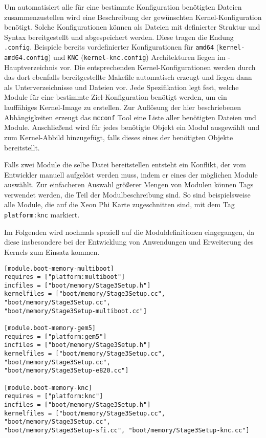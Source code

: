 Um automatisiert alle für eine bestimmte Konfiguration benötigten Dateien
zusammenzustellen wird eine Beschreibung der gewünschten Kernel-Konfiguration
benötigt. Solche Konfigurationen können als Dateien mit definierter
Struktur und Syntax bereitgestellt und abgespeichert werden. Diese tragen die
Endung \texttt{.config}. Beispiele bereits vordefinierter Konfigurationen für
\texttt{amd64} (\texttt{kernel-amd64.config}) und \texttt{KNC}
(\texttt{kernel-knc.config}) Architekturen liegen im \mythos-Hauptverzeichnis
vor. Die entsprechenden Kernel-Konfigurationen werden durch das dort ebenfalls
bereitgestellte Makefile automatisch erzeugt und liegen dann
als Unterverzeichnisse und Dateien vor. Jede Spezifikation legt fest,
welche Module für eine bestimmte Ziel-Konfiguration benötigt werden, um ein
lauffähiges Kernel-Image zu erstellen. Zur Auflösung der hier
beschriebenen Abhängigkeiten erzeugt das \texttt{mcconf} Tool eine Liste aller
benötigten Dateien und Module. Anschließend wird für jedes benötigte Objekt ein
Modul ausgewählt und zum Kernel-Abbild hinzugefügt, falls dieses eines der
benötigten Objekte bereitstellt.

Falls zwei Module die selbe Datei bereitstellen entsteht ein Konflikt, der vom
Entwickler manuell aufgelöst werden muss, indem er eines der möglichen Module
auswählt. Zur einfacheren Auswahl größerer Mengen von Modulen können Tags
verwendet werden, die Teil der Modulbeschreibung sind. So sind beispielsweise
alle Module, die auf die Xeon Phi Karte zugeschnitten sind, mit dem Tag
\texttt{platform:knc} markiert.

Im Folgenden wird nochmals speziell auf die Moduldefinitionen eingegangen, da
diese insbesondere bei der Entwicklung von Anwendungen und Erweiterung des
Kernels zum Einsatz kommen.

\begin{lstlisting}[float, label=lst:module, caption=Ein Beispiel einer
Modulbeschreibung (\texttt{mcconf.module}).]
[module.boot-memory-multiboot]
requires = ["platform:multiboot"]
incfiles = ["boot/memory/Stage3Setup.h"]
kernelfiles = ["boot/memory/Stage3Setup.cc", "boot/memory/Stage3Setup.cc",
"boot/memory/Stage3Setup-multiboot.cc"]

[module.boot-memory-gem5]
requires = ["platform:gem5"]
incfiles = ["boot/memory/Stage3Setup.h"]
kernelfiles = ["boot/memory/Stage3Setup.cc", "boot/memory/Stage3Setup.cc",
"boot/memory/Stage3Setup-e820.cc"]

[module.boot-memory-knc]
requires = ["platform:knc"]
incfiles = ["boot/memory/Stage3Setup.h"]
kernelfiles = ["boot/memory/Stage3Setup.cc", "boot/memory/Stage3Setup.cc",
"boot/memory/Stage3Setup-sfi.cc", "boot/memory/Stage3Setup-knc.cc"]
\end{lstlisting}

